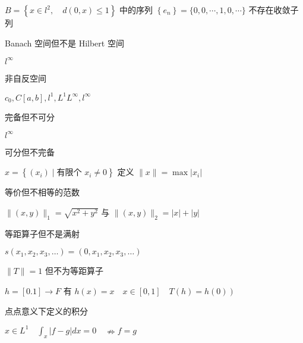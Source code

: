 \documentclass[10pt, twocolumn]{yerbaformat}
\begin{document}
$B=\left\{x \in l^{2}, \quad d(0, x) \leqslant 1\right\}$ 中的序列 $\left\{e_{n}\right\}=\{0,0, \cdots, 1,0, \cdots\}$ 不存在收敛子列

\begin{example}
    Banach 空间但不是 Hilbert 空间
\end{example}

$l^{\infty}$ 

\begin{example}
    非自反空间
\end{example}

$c_{0}, C[a, b], l^{1}, L^{1} L^{\infty}, l^{\infty}$



\begin{example}
    完备但不可分
\end{example}

$l^{\infty}$ 

\begin{example}
    可分但不完备
\end{example}

$x=\left\{\left(x_{i}\right) \mid \text{有限个 } x_{i} \neq 0\right\}$ 定义 $\|x\|=\max \left|x_{i}\right|$

\begin{example}
    等价但不相等的范数
\end{example}

$\|(x, y)\|_{1}=\sqrt{x^{2}+y^{2}}$ 与 $\|(x, y)\|_{2} = |x|+|y|$


\begin{example}
    等距算子但不是满射
\end{example}

$s\left(x_{1}, x_{2}, x_{3}, \ldots\right)=\left(0, x_{1}, x_{2}, x_{3}, \ldots\right)$

\begin{example}
    $\|T\|=1$ 但不为等距算子
\end{example}

$h=[0.1] \rightarrow F$ 有 $\left.h(x)=x \quad x \in [0,1] \quad T(h)=h(0)\right)$

\begin{example}
    点点意义下定义的积分
\end{example}

$x \in L^{1} \quad \int_{x}|f-g| d x=0 \quad \nRightarrow f=g$
\end{document}
